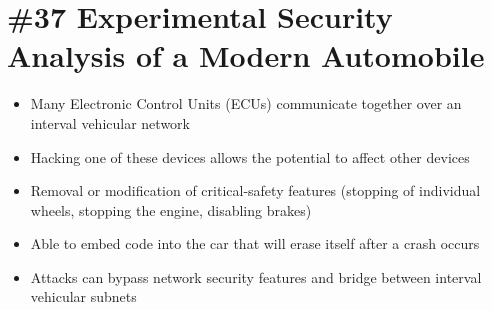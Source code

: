 \section{\#37 Experimental Security Analysis of a Modern Automobile}
\begin{itemize}
	\item Many Electronic Control Units (ECUs) communicate together over an interval vehicular network
	\item Hacking one of these devices allows the potential to affect other devices
	\item Removal or modification of critical-safety features (stopping of individual wheels, stopping the engine, disabling brakes)
	\item Able to embed code into the car that will erase itself after a crash occurs
	\item Attacks can bypass network security features and bridge between interval vehicular subnets
\end{itemize}